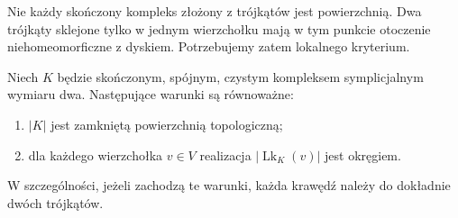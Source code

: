 Nie każdy skończony kompleks złożony z trójkątów jest
powierzchnią. Dwa trójkąty sklejone tylko w jednym
wierzchołku mają w tym punkcie otoczenie niehomeomorficzne
z dyskiem. Potrzebujemy zatem lokalnego kryterium.

\begin{twierdzenie}
\label{thm:tg-link-surface}
Niech $K$ będzie skończonym, spójnym, czystym
kompleksem symplicjalnym wymiaru dwa. Następujące warunki
są równoważne:
\begin{enumerate}[label=(\roman*)]
\item $|K|$ jest zamkniętą powierzchnią topologiczną;
\item dla każdego wierzchołka $v\in V$ realizacja
$|\operatorname{Lk}_K(v)|$ jest okręgiem.
\end{enumerate}
W szczególności, jeżeli zachodzą te warunki, każda
krawędź należy do dokładnie dwóch trójkątów.
\end{twierdzenie}

